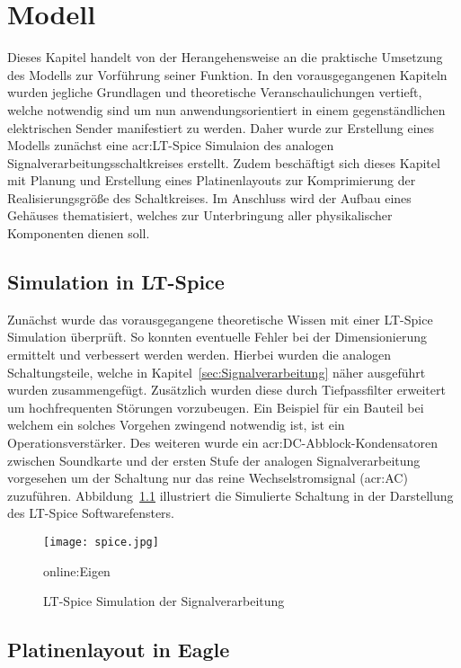 
\chapter{Modell}
\label{sec:modell}
Dieses Kapitel handelt von der Herangehensweise an die praktische Umsetzung des Modells zur Vorführung seiner Funktion. In den vorausgegangenen Kapiteln wurden jegliche Grundlagen und theoretische Veranschaulichungen vertieft, welche notwendig sind um nun anwendungsorientiert in einem gegenständlichen elektrischen Sender manifestiert zu werden. Daher wurde zur Erstellung eines Modells zunächst eine \gls{acr:LT}-Spice Simulaion des analogen Signalverarbeitungsschaltkreises erstellt. Zudem beschäftigt sich dieses Kapitel mit Planung und Erstellung eines Platinenlayouts zur Komprimierung der Realisierungsgröße des Schaltkreises. Im Anschluss wird der Aufbau eines Gehäuses thematisiert, welches zur Unterbringung aller physikalischer Komponenten dienen soll.

\section{Simulation in LT-Spice}
\label{sec:simlt}

Zunächst wurde das vorausgegangene theoretische Wissen mit einer LT-Spice Simulation überprüft. So konnten eventuelle Fehler bei der Dimensionierung ermittelt und verbessert werden werden. Hierbei wurden die analogen Schaltungsteile, welche in Kapitel~\ref{sec:Signalverarbeitung} näher ausgeführt wurden zusammengefügt. Zusätzlich wurden diese durch Tiefpassfilter erweitert um hochfrequenten Störungen vorzubeugen. Ein Beispiel für ein Bauteil bei welchem ein solches Vorgehen zwingend notwendig ist, ist ein Operationsverstärker. Des weiteren wurde ein \gls{acr:DC}-Abblock-Kondensatoren zwischen Soundkarte und der ersten Stufe der analogen Signalverarbeitung vorgesehen um der Schaltung nur das reine Wechselstromsignal (\gls{acr:AC}) zuzuführen. Abbildung~\ref{fig:spice} illustriert die Simulierte Schaltung in der Darstellung des LT-Spice Softwarefensters.

\begin{figure}[H]
	\centering
	\texttt{[image: spice.jpg]}
	\caption[LT-Spice Simulation der Signalverarbeitung]{LT-Spice Simulation der Signalverarbeitung} \gls{online:Eigen}
	\label{fig:spice}
\end{figure}

\section{Platinenlayout in Eagle}
\label{sec:platineeagle}

